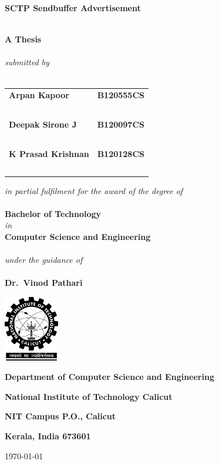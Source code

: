 \begin{titlepage}
  \centering

  {\large \textbf{SCTP Sendbuffer Advertisement}\\~\\}

  \textbf{A Thesis}\\~\\

  \emph{submitted by}\\~\\

  \begin{tabular}{lr}
    \textbf{Arpan Kapoor} & \textbf{B120555CS}\\~\\
    \textbf{Deepak Sirone J} & \textbf{B120097CS}\\~\\
    \textbf{K Prasad Krishnan} & \textbf{B120128CS}\\~\\
  \end{tabular}

  \bigskip
  \emph{in partial fulfilment for the award of the degree of}\\~\\

  \textbf{Bachelor of Technology}\\
  \emph{in}\\
  \textbf{Computer Science and Engineering}\\~\\

  \emph{under the guidance of}\\~\\

  \textbf{Dr.~Vinod Pathari}

  \vfill
  \includegraphics[width=0.18\textwidth]{imgs/nitc-logo.png}

  {\large \textbf{Department of Computer Science and Engineering}\par}
  {\large \textbf{National Institute of Technology Calicut}\par}
  {\large \textbf{NIT Campus P.O., Calicut}\par}
  {\large \textbf{Kerala, India 673601}\par}

  {\today\par}
\end{titlepage}
